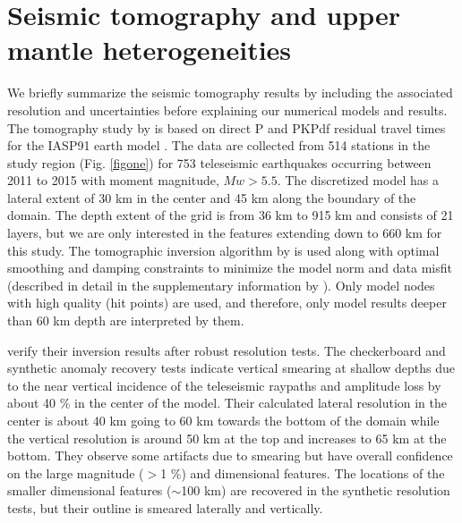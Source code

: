 \documentclass[draft,linenumbers]{agujournal2018}
\begin{document}
\section{Seismic tomography and upper mantle heterogeneities}
We briefly summarize the seismic tomography results by \citet{Biryol_2016} including the associated resolution and uncertainties before explaining our numerical models and results. The tomography study by \citet{Biryol_2016} is based on direct P and PKPdf residual travel times for the IASP91 earth model \citep{kennett1991traveltimes}. The data are collected from 514 stations in the study region (Fig. \ref{figone}) for 753 teleseismic earthquakes occurring between 2011 to 2015 with moment magnitude, $Mw > 5.5$. The discretized model has a lateral extent of 30 km in the center and 45 km along the boundary of the domain. The depth extent of the grid is from 36 km to 915 km and consists of 21 layers, but we are only interested in the features extending down to 660 km for this study. The tomographic inversion algorithm by \citet{schmandt2010seismic} is used along with optimal smoothing and damping constraints to minimize the model norm and data misfit (described in detail in the supplementary information by \citet{Biryol_2016}). Only model nodes with high quality (hit points) are used, and therefore, only model results deeper than 60 km depth are interpreted by them.
    
    \citet{Biryol_2016} verify their inversion results after robust resolution tests. The checkerboard and synthetic anomaly recovery tests indicate vertical smearing at shallow depths due to the near vertical incidence of the teleseismic raypaths and amplitude loss by about 40 \% in the center of the model. Their calculated lateral resolution in the center is about 40 km going to 60 km towards the bottom of the domain while the vertical resolution  is around 50 km at the top and increases to 65 km at the bottom. They observe some artifacts due to smearing but have overall confidence on the large magnitude ($>$1 \%) and dimensional features. The locations of the smaller dimensional features ($\sim$100 km) are recovered in the synthetic resolution tests, but their outline is smeared laterally and vertically. 
    
\end{document}
